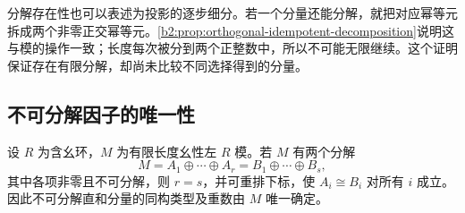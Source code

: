 \ProseParagraphBreak
分解存在性也可以表述为投影的逐步细分。若一个分量还能分解，就把对应幂等元拆成两个非零正交幂等元。\cref{b2:prop:orthogonal-idempotent-decomposition}说明这与模的操作一致；长度每次被分到两个正整数中，所以不可能无限继续。这个证明保证存在有限分解，却尚未比较不同选择得到的分量。

\subsection{不可分解因子的唯一性}
\label{b2:subsec:1204:02}

\begin{theorem}\label{b2:thm:krull-schmidt}
	设 \(R\) 为含幺环，\(M\) 为有限长度幺性左 \(R\) 模。若 \(M\) 有两个分解
	\[
		M=A_1\oplus\cdots\oplus A_r =B_1\oplus\cdots\oplus B_s,
	\]
	其中各项非零且不可分解，则 \(r=s\)，并可重排下标，使 \(A_i\cong B_i\) 对所有 \(i\) 成立。因此不可分解直和分量的同构类型及重数由 \(M\) 唯一确定。
\end{theorem}
